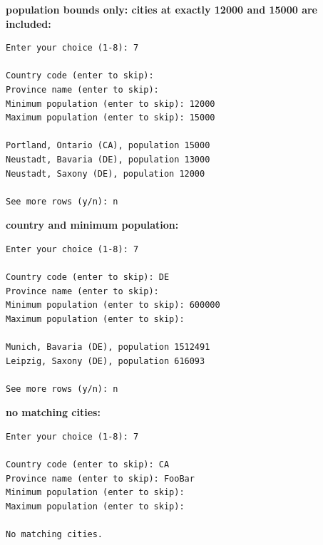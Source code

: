 \documentclass[11pt]{article}
\begin{document}
\noindent \textbf{population bounds only: cities at exactly 12000 and 15000 are included:}
{\small
\begin{verbatim}
Enter your choice (1-8): 7

Country code (enter to skip): 
Province name (enter to skip): 
Minimum population (enter to skip): 12000
Maximum population (enter to skip): 15000

Portland, Ontario (CA), population 15000
Neustadt, Bavaria (DE), population 13000
Neustadt, Saxony (DE), population 12000

See more rows (y/n): n
\end{verbatim}
}

\noindent \textbf{country and minimum population:}
{\small
\begin{verbatim}
Enter your choice (1-8): 7

Country code (enter to skip): DE
Province name (enter to skip): 
Minimum population (enter to skip): 600000
Maximum population (enter to skip): 

Munich, Bavaria (DE), population 1512491
Leipzig, Saxony (DE), population 616093

See more rows (y/n): n
\end{verbatim}
}

\noindent \textbf{no matching cities:}
{\small
\begin{verbatim}
Enter your choice (1-8): 7

Country code (enter to skip): CA
Province name (enter to skip): FooBar
Minimum population (enter to skip): 
Maximum population (enter to skip): 

No matching cities.
\end{verbatim}
}
\end{document}
